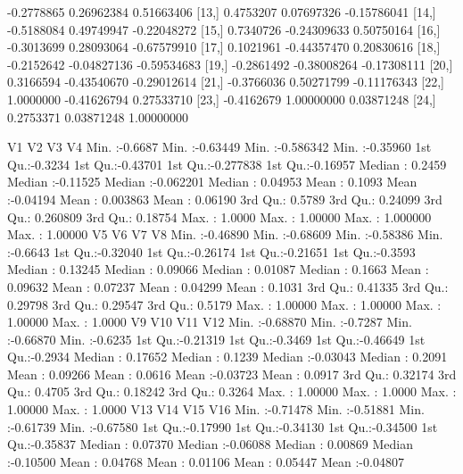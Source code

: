 \documentclass[a4paper, 12pt]{article}
\begin{document}
\begin{table}[H]
\begin{Schunk}
\begin{Soutput}
[12,] -0.2778865  0.26962384  0.51663406
[13,]  0.4753207  0.07697326 -0.15786041
[14,] -0.5188084  0.49749947 -0.22048272
[15,]  0.7340726 -0.24309633  0.50750164
[16,] -0.3013699  0.28093064 -0.67579910
[17,]  0.1021961 -0.44357470  0.20830616
[18,] -0.2152642 -0.04827136 -0.59534683
[19,] -0.2861492 -0.38008264 -0.17308111
[20,]  0.3166594 -0.43540670 -0.29012614
[21,] -0.3766036  0.50271799 -0.11176343
[22,]  1.0000000 -0.41626794  0.27533710
[23,] -0.4162679  1.00000000  0.03871248
[24,]  0.2753371  0.03871248  1.00000000
\end{Soutput}
\begin{Soutput}
       V1                V2                 V3                  V4          
 Min.   :-0.6687   Min.   :-0.63449   Min.   :-0.586342   Min.   :-0.35960  
 1st Qu.:-0.3234   1st Qu.:-0.43701   1st Qu.:-0.277838   1st Qu.:-0.16957  
 Median : 0.2459   Median :-0.11525   Median :-0.062201   Median : 0.04953  
 Mean   : 0.1093   Mean   :-0.04194   Mean   : 0.003863   Mean   : 0.06190  
 3rd Qu.: 0.5789   3rd Qu.: 0.24099   3rd Qu.: 0.260809   3rd Qu.: 0.18754  
 Max.   : 1.0000   Max.   : 1.00000   Max.   : 1.000000   Max.   : 1.00000  
       V5                 V6                 V7                 V8         
 Min.   :-0.46890   Min.   :-0.68609   Min.   :-0.58386   Min.   :-0.6643  
 1st Qu.:-0.32040   1st Qu.:-0.26174   1st Qu.:-0.21651   1st Qu.:-0.3593  
 Median : 0.13245   Median : 0.09066   Median : 0.01087   Median : 0.1663  
 Mean   : 0.09632   Mean   : 0.07237   Mean   : 0.04299   Mean   : 0.1031  
 3rd Qu.: 0.41335   3rd Qu.: 0.29798   3rd Qu.: 0.29547   3rd Qu.: 0.5179  
 Max.   : 1.00000   Max.   : 1.00000   Max.   : 1.00000   Max.   : 1.0000  
       V9                V10               V11                V12         
 Min.   :-0.68870   Min.   :-0.7287   Min.   :-0.66870   Min.   :-0.6235  
 1st Qu.:-0.21319   1st Qu.:-0.3469   1st Qu.:-0.46649   1st Qu.:-0.2934  
 Median : 0.17652   Median : 0.1239   Median :-0.03043   Median : 0.2091  
 Mean   : 0.09266   Mean   : 0.0616   Mean   :-0.03723   Mean   : 0.0917  
 3rd Qu.: 0.32174   3rd Qu.: 0.4705   3rd Qu.: 0.18242   3rd Qu.: 0.3264  
 Max.   : 1.00000   Max.   : 1.0000   Max.   : 1.00000   Max.   : 1.0000  
      V13                V14                V15                V16          
 Min.   :-0.71478   Min.   :-0.51881   Min.   :-0.61739   Min.   :-0.67580  
 1st Qu.:-0.17990   1st Qu.:-0.34130   1st Qu.:-0.34500   1st Qu.:-0.35837  
 Median : 0.07370   Median :-0.06088   Median : 0.00869   Median :-0.10500  
 Mean   : 0.04768   Mean   : 0.01106   Mean   : 0.05447   Mean   :-0.04807  

\end{Soutput}
\end{Schunk}
\end{table}
\end{document}
